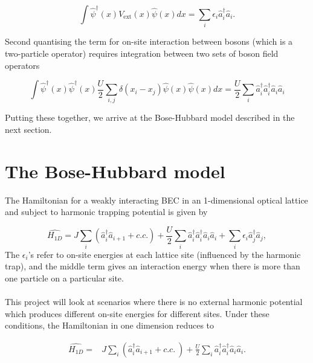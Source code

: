 \documentclass[a4paper,10pt]{article}
\begin{document}
\begin{equation}
 \int  \hat{\psi}^{\dagger}(x) V_{\text{ext}}(x)  \hat{\psi}(x)dx = \sum_i \epsilon_i \hat{a}_i^{\dagger}\hat{a}_i.
\end{equation}

Second quantising the term for on-site interaction between bosons (which is a two-particle operator) requires integration between two sets of boson field operators 

\begin{equation}
 \int  \hat{\psi}^{\dagger}(x)\hat{\psi}^{\dagger}(x) \frac{U}{2}\sum_{i,j}\delta(x_{i}-x_{j})  \hat{\psi}(x) \hat{\psi}(x) dx = \frac{U}{2}\sum_i \hat{a}_i^{\dagger}\hat{a}_i^{\dagger}\hat{a}_i\hat{a}_i
\end{equation}


Putting these together, we arrive at the Bose-Hubbard model described in the next section.
\newpage




\section{The Bose-Hubbard model}

The Hamiltonian for a weakly interacting BEC in an 1-dimensional optical lattice and subject to harmonic trapping potential is given by

\begin{equation}
 \hat{H_{1D}}=J\sum_{i}(\hat{a}^\dagger_{i}\hat{a}_{i+1}+c.c.)+\frac{U}{2}\sum_{i}\hat{a}^\dagger_{i}\hat{a}^\dagger_{i}\hat{a}_{i}\hat{a}_{i}+\sum_{i}{\epsilon_i}\hat{a}^\dagger_{j}\hat{a}_{j},
\end{equation}
The $\epsilon_i$'s refer to on-site energies at each lattice site (influenced by the harmonic trap), and the middle term gives an interaction energy when there is more than one particle 
on a particular site.
\\\\
This project will look at scenarios where there is no external harmonic potential which produces different on-site energies for different sites.  
Under these conditions, the Hamiltonian in one dimension reduces to

\begin{equation}
\begin{align*}
\hat{H_{1D}}=&J\sum_{i}(\hat{a}^\dagger_{i}\hat{a}_{i+1}+c.c.\ ) +\frac{U}{2}\sum_{i}\hat{a}^\dagger_{i}\hat{a}^\dagger_{i}\hat{a}_{i}\hat{a}_{i}.
\end{align*}
\end{equation}
\end{document}
